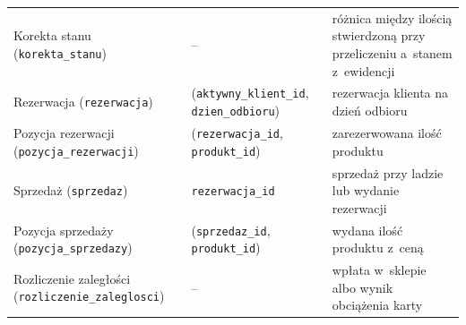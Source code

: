 \documentclass[12pt,a4paper,oneside]{article}
\begin{document}
\begin{table}[H]
\begin{tabularx}{\textwidth}{@{}L{3.3cm}L{3.4cm}>{\raggedright\arraybackslash}X@{}}
		Korekta stanu (\texttt{korekta\_\allowbreak{}stanu}) & -- & różnica między ilością stwierdzoną przy przeliczeniu a~stanem z~ewidencji \\
		Rezerwacja (\texttt{rezerwacja}) & (\texttt{aktywny\_\allowbreak{}klient\_\allowbreak{}id}, \texttt{dzien\_\allowbreak{}odbioru}) & rezerwacja klienta na dzień odbioru \\
		Pozycja rezerwacji (\texttt{pozycja\_\allowbreak{}rezerwacji}) & (\texttt{rezerwacja\_\allowbreak{}id}, \texttt{produkt\_\allowbreak{}id}) & zarezerwowana ilość produktu \\
		Sprzedaż (\texttt{sprzedaz}) & \texttt{rezerwacja\_\allowbreak{}id} & sprzedaż przy ladzie lub wydanie rezerwacji \\
		Pozycja sprzedaży (\texttt{pozycja\_\allowbreak{}sprzedazy}) & (\texttt{sprzedaz\_\allowbreak{}id}, \texttt{produkt\_\allowbreak{}id}) & wydana ilość produktu z~ceną \\
		Rozliczenie zaległości (\texttt{rozliczenie\_\allowbreak{}zaleglosci}) & -- & wpłata w~sklepie albo wynik obciążenia karty \\
		\bottomrule
	\end{tabularx}
\end{table}
\end{document}
